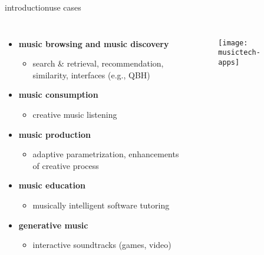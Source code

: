        \begin{frame}{introduction}{use cases}
            \vspace{-3mm}
            \begin{columns}
            \begin{itemize}
                \item	\textbf{music browsing and music discovery} 
                    \begin{itemize}
                        \item   search \& retrieval, recommendation, similarity, interfaces (e.g., QBH)
                    \end{itemize}
                \smallskip
                \item<2->	\textbf{music consumption} 
                    \begin{itemize}
                        \item   creative music listening
                    \end{itemize}
                \smallskip
                \item<3->	 \textbf{music production}
                    \begin{itemize}
                        \item   adaptive parametrization, enhancements of creative process
                    \end{itemize}
                \smallskip
                \item<4->	\textbf{music education}
                    \begin{itemize}
                        \item   musically intelligent software tutoring
                    \end{itemize}
                \smallskip
                \item<5->	\textbf{generative music}
                    \begin{itemize}
                        \item   interactive soundtracks (games, video)
                    \end{itemize}
            \end{itemize}
                \begin{figure}%
                    \texttt{[image: musictech-apps]}%
                \end{figure}
            \end{columns}
            
        \end{frame}
         
